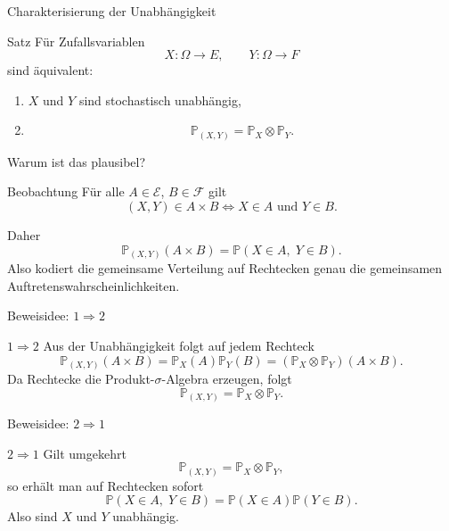 \documentclass{beamer}
\begin{document}
\begin{frame}{Charakterisierung der Unabhängigkeit}
\begin{block}{Satz}
Für Zufallsvariablen
\[
X\colon \Omega\to E,\qquad Y\colon \Omega\to F
\]
sind äquivalent:
\begin{enumerate}
    \item \(X\) und \(Y\) sind stochastisch unabhängig,
    \item
    \[
    \mathbb P_{(X,Y)}=\mathbb P_X\otimes\mathbb P_Y.
    \]
\end{enumerate}
\end{block}
\end{frame}

\begin{frame}{Warum ist das plausibel?}
\begin{block}{Beobachtung}
Für alle \(A\in\mathcal E\), \(B\in\mathcal F\) gilt
\[
(X,Y)\in A\times B
\iff
X\in A \text{ und } Y\in B.
\]
\end{block}

\begin{block}{Daher}
\[
\mathbb P_{(X,Y)}(A\times B)
=
\mathbb P(X\in A,\;Y\in B).
\]
Also kodiert die gemeinsame Verteilung auf Rechtecken genau die gemeinsamen Auftretenswahrscheinlichkeiten.
\end{block}
\end{frame}

\begin{frame}{Beweisidee: \(1\Rightarrow 2\)}
\begin{block}{\(1\Rightarrow 2\)}
Aus der Unabhängigkeit folgt auf jedem Rechteck
\[
\mathbb P_{(X,Y)}(A\times B)
=
\mathbb P_X(A)\mathbb P_Y(B)
=
(\mathbb P_X\otimes\mathbb P_Y)(A\times B).
\]
Da Rechtecke die Produkt-\(\sigma\)-Algebra erzeugen, folgt
\[
\mathbb P_{(X,Y)}=\mathbb P_X\otimes\mathbb P_Y.
\]
\end{block}
\end{frame}

\begin{frame}{Beweisidee: \(2\Rightarrow 1\)}
\begin{block}{\(2\Rightarrow 1\)}
Gilt umgekehrt
\[
\mathbb P_{(X,Y)}=\mathbb P_X\otimes\mathbb P_Y,
\]
so erhält man auf Rechtecken sofort
\[
\mathbb P(X\in A,\;Y\in B)=\mathbb P(X\in A)\mathbb P(Y\in B).
\]
Also sind \(X\) und \(Y\) unabhängig.
\end{block}
\end{frame}
\end{document}
